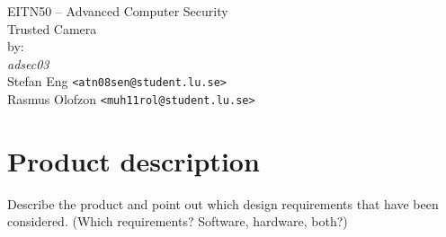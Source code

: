 \documentclass[10pt]{article}
\newcommand{\comm}[1]{{\leavevmode\color{gray}#1}}
\begin{document}

  \thispagestyle{empty}
  \vspace*{3cm}
  \begin{center}
    \huge{EITN50 -- Advanced Computer Security} \\
    \vspace{0.3cm}
    \LARGE{Trusted Camera} \\
    \vspace{1cm}
    \large{by: \\ \vspace{0.2cm}
	\textit{adsec03} \\
        Stefan Eng \texttt{<atn08sen@student.lu.se>} \\
        Rasmus Olofzon \texttt{<muh11rol@student.lu.se>}
        } \\
  \end{center}


  \newpage

  \section{Product description}

    \comm{Describe the product and point out which design requirements that have
    been considered. (Which requirements? Software, hardware, both?)}
\end{document}
